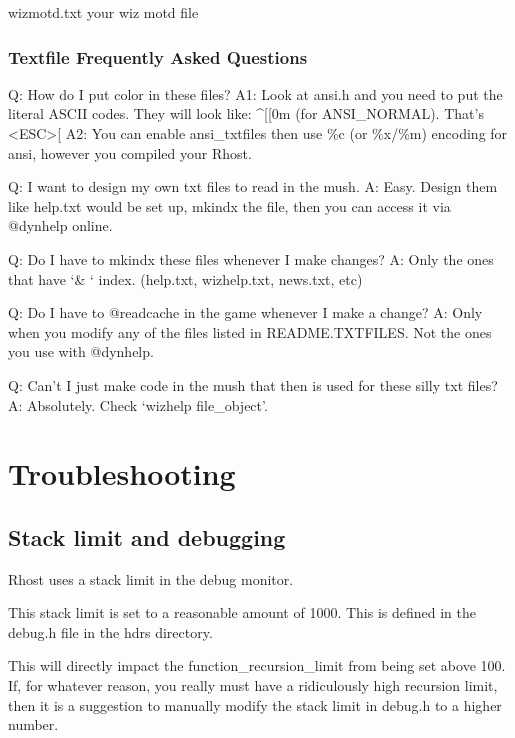 \documentclass[letterpaper,10pt,english]{sphinxmanual}
\begin{document}
\sphinxAtStartPar
wizmotd.txt            \sphinxhyphen{} your wiz motd file


\subsubsection{Textfile Frequently Asked Questions}
\label{\detokenize{maintenance:textfile-frequently-asked-questions}}
\sphinxAtStartPar
Q:  How do I put color in these files?
A1: Look at ansi.h and you need to put the literal ASCII codes.  They will look like: \textasciicircum{}{[}{[}0m (for ANSI\_NORMAL).  That’s \textless{}ESC\textgreater{}{[}
A2: You can enable ansi\_txtfiles then use \%c (or \%x/\%m) encoding for ansi, however you compiled your Rhost.

\sphinxAtStartPar
Q:  I want to design my own txt files to read in the mush.
A:  Easy.  Design them like help.txt would be set up, mkindx the file, then you can access it via @dynhelp online.

\sphinxAtStartPar
Q:  Do I have to mkindx these files whenever I make changes?
A:  Only the ones that have ‘\& ‘ index. (help.txt, wizhelp.txt, news.txt, etc)

\sphinxAtStartPar
Q:  Do I have to @readcache in the game whenever I make a change?
A:  Only when you modify any of the files listed in README.TXTFILES.  Not the ones you use with @dynhelp.

\sphinxAtStartPar
Q:  Can’t I just make code in the mush that then is used for these silly txt files?
A:  Absolutely.  Check ‘wizhelp file\_object’.


\section{Troubleshooting}
\label{\detokenize{troubleshooting:troubleshooting}}\label{\detokenize{troubleshooting::doc}}

\subsection{Stack limit and debugging}
\label{\detokenize{troubleshooting:stack-limit-and-debugging}}
\sphinxAtStartPar
Rhost uses a stack limit in the debug monitor.

\sphinxAtStartPar
This stack limit is set to a reasonable amount of 1000.
This is defined in the debug.h file in the hdrs directory.

\sphinxAtStartPar
This will directly impact the function\_recursion\_limit from being
set above 100.  If, for whatever reason, you really must have
a ridiculously high recursion limit, then it is a suggestion to
manually modify the stack limit in debug.h to a higher number.
\end{document}

